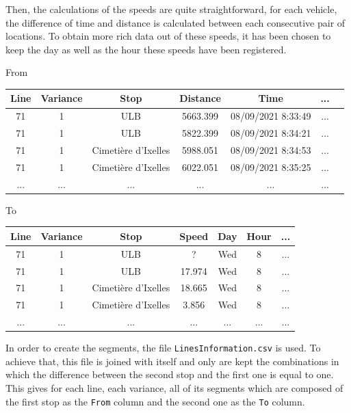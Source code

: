 \documentclass{article}
\begin{document}
Then, the calculations of the speeds are quite straightforward, for each vehicle, the difference of time and distance is calculated between each consecutive pair of locations. To obtain more rich data out of these speeds, it has been chosen to keep the day as well as the hour these speeds have been registered.

\begin{center}
From
\end{center}

\begin{center}
\begin{tabular}{|c|c|c|c|c|c|c|} 
 \hline
 Line & Variance & Stop & Distance & Time & ...\\ [0.5ex]
 \hline\hline
 71 & 1 & ULB & 5663.399 & 08/09/2021 8:33:49 & ... \\ 
 \hline
 71 & 1 & ULB & 5822.399 & 08/09/2021 8:34:21 & ... \\
 \hline
 71 & 1 & Cimetière d'Ixelles & 5988.051 & 08/09/2021 8:34:53 & ... \\
 \hline
 71 & 1 & Cimetière d'Ixelles & 6022.051 & 08/09/2021 8:35:25 & ... \\
 \hline
 ... & ... & ... & ... & ... & ... \\
 \hline
\end{tabular}
\end{center}

\begin{center}
To
\end{center}

\begin{center}
\begin{tabular}{|c|c|c|c|c|c|c|} 
 \hline
 Line & Variance & Stop & Speed & Day & Hour & ...\\ [0.5ex]
 \hline\hline
 71 & 1 & ULB & ? & Wed & 8 & ... \\ 
 \hline
 71 & 1 & ULB & 17.974 & Wed & 8 & ... \\
 \hline
 71 & 1 & Cimetière d'Ixelles & 18.665 & Wed & 8 &  ... \\
 \hline
 71 & 1 & Cimetière d'Ixelles & 3.856 & Wed & 8 & ... \\
 \hline
 ... & ... & ... & ... & ... & ... & ... \\
 \hline
\end{tabular}
\end{center}



In order to create the segments, the file \texttt{LinesInformation.csv} is used. To achieve that, this file is joined with itself and only are kept the combinations in which the difference between the second stop and the first one is equal to one. This gives for each line, each variance, all of its segments which are composed of the first stop as the \texttt{From} column and the second one as the \texttt{To} column.
\end{document}
